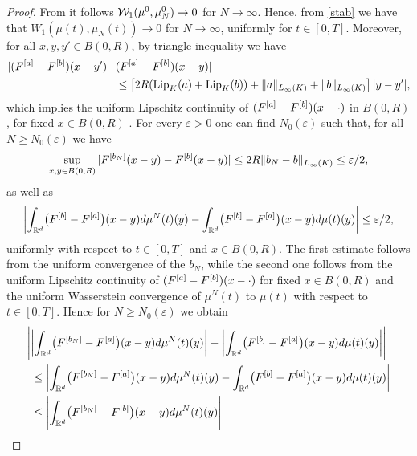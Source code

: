 \begin{proof}
	From \cite[Lemma 3.3]{fornahuetter} it follows $\mathcal{W}_1(\mu^0,\mu_N^0) \rightarrow 0$ for $N \rightarrow \infty$. Hence, from \eqref{stab} we have that $W_1(\mu(t),\mu_N(t))\rightarrow 0$ for $N\rightarrow\infty$, uniformly for  $t \in [0,T]$. %
Moreover, for all $x,y,y' \in B(0,R)$, by triangle inequality we have
\begin{align*}
|(F^{[a]} -F^{[b]})(x-y') - &(F^{[a]} -F^{[b]})(x- y)|  \\
& \leq \left[2R (\textup{Lip}_K(a) + \textup{Lip}_K( b))    +\|a\|_{L_\infty(K)} + \| b\|_{L_\infty(K)} \right] |y-y'|,
\end{align*}
which implies the uniform Lipschitz continuity of $(F^{[a]} -F^{[b]})(x- \cdot)$ in $B(0,R)$, for fixed $x\in B(0,R)$  .
For every $\varepsilon > 0$ one can find $N_0(\varepsilon)$ such that, for all $N \geq N_0(\varepsilon)$ we have
	\begin{align*}
		\sup_{x,y \in B(0,R)}|F^{[b_{N}]}(x-y)-F^{[b]}(x-y)|
			\leq 2R \| b_{N}- b\|_{L_\infty(K)}\leq\varepsilon/2,
	\end{align*}
	as well as
	\begin{align*}
		\biggl|\int_{\mathbb{R}^d}\bigl(F^{[b]}-F^{[a]}\bigr)(x-y)d\mu^{N}(t)(y)
			-\int_{\mathbb{R}^d}\bigl(F^{[b]}-F^{[a]}\bigr)(x-y)d\mu(t)(y)\biggr|\leq\varepsilon/2,
	\end{align*}
uniformly with respect to $t \in [0,T]$ and $x \in B(0,R)$.
	The first estimate follows from  the uniform convergence of the $ b_{N}$, while the second one follows from the uniform Lipschitz continuity of
	$(F^{[a]} -F^{[b]})(x- \cdot)$ for fixed $x\in B(0,R)$   and the uniform Wasserstein convergence of $\mu^{N}(t)$ to $\mu(t)$ with respect to $t \in [0,T]$. Hence for $N\geq N_0(\varepsilon)$ we obtain
	\begin{align*}
		\Biggl|
			&\biggl|\int_{\R^d}\bigl(\Fun{b_{N}}-\Fun{a}\bigr)(x-y)d\mu^{N}(t)(y)\biggr|
				-\biggl|\int_{\R^d}\bigl(\Fun{b}-\Fun{a}\bigr)(x-y)d\mu(t)(y)\biggr|\Biggr|\\
			&\leq\biggl|\int_{\R^d}\bigl(\Fun{b_{N}}-\Fun{a}\bigr)(x-y)d\mu^{N}(t)(y)
					-\int_{\R^d}\bigl(\Fun{b}-\Fun{a}\bigr)(x-y)d\mu(t)(y)\biggr|\\
			&\leq\Biggl|\int_{\R^d}
				\bigl(\Fun{b_{N}}-\Fun{b}\bigr)(x-y)d\mu^{N}(t)(y)\Biggr|\\

\end{align*}
\end{proof}
